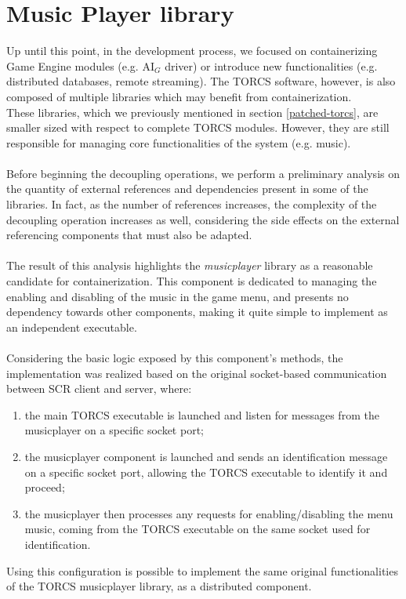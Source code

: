 \section{Music Player library}
Up until this point, in the development process, we focused on containerizing Game Engine modules (e.g. AI$_G$ driver) or introduce new functionalities (e.g. distributed databases, remote streaming). The TORCS software, however, is also composed of multiple libraries which may benefit from containerization. \\
These libraries, which we previously mentioned in section \ref{patched-torcs}, are smaller sized with respect to complete TORCS modules. However, they are still responsible for managing core functionalities of the system (e.g. music). \\ \\
Before beginning the decoupling operations, we perform a preliminary analysis on the quantity of external references and dependencies present in some of the libraries. In fact, as the number of references increases, the complexity of the decoupling operation increases as well, considering the side effects on the external referencing components that must also be adapted. \\ \\
The result of this analysis highlights the \textit{musicplayer} library as a reasonable candidate for containerization. This component is dedicated to managing the enabling and disabling of the music in the game menu, and presents no dependency towards other components, making it quite simple to implement as an independent executable. \\ \\
Considering the basic logic exposed by this component's methods, the implementation was realized based on the original socket-based communication between SCR client and server, where:
\begin{enumerate}
	\item the main TORCS executable is launched and listen for messages from the musicplayer on a specific socket port;
	\item the musicplayer component is launched and sends an identification message on a specific socket port, allowing the TORCS executable to identify it and proceed;
	\item the musicplayer then processes any requests for enabling/disabling the menu music, coming from the TORCS executable on the same socket used for identification.
\end{enumerate}
Using this configuration is possible to implement the same original functionalities of the TORCS musicplayer library, as a distributed component.

